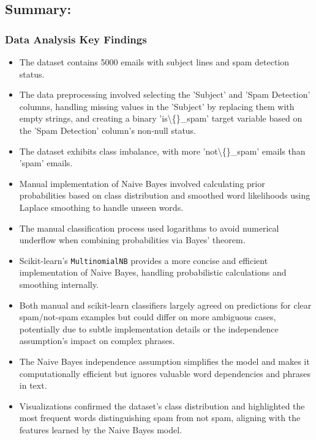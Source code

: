 \documentclass[12pt,a4paper]{article}
\begin{document}
\subsection{Summary:}

\subsubsection{Data Analysis Key Findings}

\begin{itemize}
    \item The dataset contains 5000 emails with subject lines and spam detection status.
    \item The data preprocessing involved selecting the 'Subject' and 'Spam Detection' columns, handling missing values in the 'Subject' by replacing them with empty strings, and creating a binary 'is\textbackslash\{\}\_spam' target variable based on the 'Spam Detection' column's non-null status.
    \item The dataset exhibits class imbalance, with more 'not\textbackslash\{\}\_spam' emails than 'spam' emails.
    \item Manual implementation of Naive Bayes involved calculating prior probabilities based on class distribution and smoothed word likelihoods using Laplace smoothing to handle unseen words.
    \item The manual classification process used logarithms to avoid numerical underflow when combining probabilities via Bayes' theorem.
    \item Scikit-learn's \texttt{MultinomialNB} provides a more concise and efficient implementation of Naive Bayes, handling probabilistic calculations and smoothing internally.
    \item Both manual and scikit-learn classifiers largely agreed on predictions for clear spam/not-spam examples but could differ on more ambiguous cases, potentially due to subtle implementation details or the independence assumption's impact on complex phrases.
    \item The Naive Bayes independence assumption simplifies the model and makes it computationally efficient but ignores valuable word dependencies and phrases in text.
    \item Visualizations confirmed the dataset's class distribution and highlighted the most frequent words distinguishing spam from not spam, aligning with the features learned by the Naive Bayes model.
\end{itemize}
\end{document}
